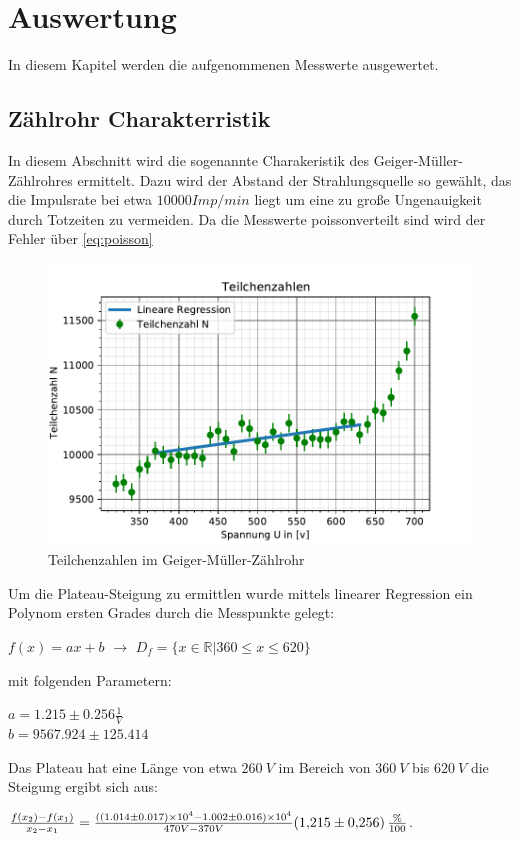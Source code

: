 \section{Auswertung}
\label{sec:auswertung}
In diesem Kapitel werden die aufgenommenen Messwerte ausgewertet.
\subsection{Zählrohr Charakterristik}
\label{sec:characteristik}
In diesem Abschnitt wird die sogenannte Charakeristik des Geiger-Müller-Zählrohres ermittelt. Dazu wird der
Abstand der Strahlungsquelle so gewählt, das die Impulsrate bei etwa $10000 Imp/min$ liegt um eine zu große 
Ungenauigkeit durch Totzeiten zu vermeiden. Da die Messwerte poissonverteilt sind wird der Fehler über \autoref{eq:poisson}
\begin{figure}
    \centering
    \includegraphics{kennlinie.pdf}
    \caption{Teilchenzahlen im Geiger-Müller-Zählrohr}
    \label{fig:teilchenzahl}
  \end{figure}
Um die Plateau-Steigung zu ermittlen wurde mittels linearer Regression ein Polynom ersten Grades durch die 
Messpunkte gelegt:
\begin{center}
  $f(x)=ax+b$ $\rightarrow$ $D_f=\{x\in\mathbb{R} \vert 360\le x\le620\}$    
\end{center}
mit folgenden Parametern:
\begin{center}
  $a=1.215\pm0.256 \frac{1}{V} $\\
  $b=9567.924\pm125.414 $
\end{center}
Das Plateau hat eine Länge von etwa $\SI{260}{V}$ im Bereich von $\SI{360}{V}$ bis $\SI{620}{V}$ die Steigung 
ergibt sich aus:
\begin{center}
 $\frac{f(x_2)-f(x_1)}{x_2-x_1}=\frac{((1.014\pm0.017)\times 10^4-1.002\pm0.016)\times 10^4}{470 V-370 V}\SI{1,215\pm0,256}{\frac{\%}{100}}$.
\end{center}
